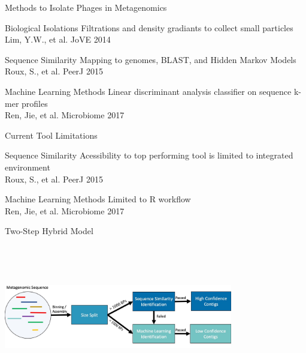 \documentclass[11pt, xcolor=table]{beamer}
\begin{document}
  \begin{frame}{Methods to Isolate Phages in Metagenomics}
  \begin{block}{Biological Isolations}
  Filtrations and density gradiants to collect small particles \\
  {\tiny Lim, Y.W., et al. JoVE 2014}
  \end{block}
  \begin{block}{Sequence Similarity}
  Mapping to genomes, BLAST, and Hidden Markov Models \\ 
  {\tiny Roux, S., et al. PeerJ 2015}
  \end{block}
  \begin{block}{Machine Learning Methods}
  Linear discriminant analysis classifier on sequence k-mer profiles \\
  {\tiny Ren, Jie, et al. Microbiome 2017}
  \end{block}
  \end{frame}
  \begin{frame}{Current Tool Limitations}
  \begin{block}{Sequence Similarity}
  Acessibility to top performing tool is limited to integrated environment \\
  {\tiny Roux, S., et al. PeerJ 2015}
  \end{block}
  \begin{block}{Machine Learning Methods}
  Limited to R workflow \\
  {\tiny Ren, Jie, et al. Microbiome 2017}
  \end{block}
  \end{frame}
  \begin{frame}{Two-Step Hybrid Model}
  \center
	\includegraphics[height=7cm, width=10cm]{CPBS_11_18/TwoStep.jpg}
  
  \end{frame}
\end{document}
